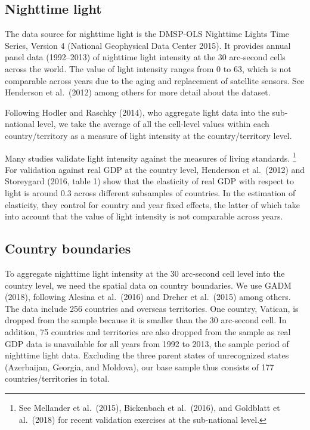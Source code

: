 \documentclass[12pt,a4paper]{article}%
\begin{document}
\subsection{Nighttime light}
The data source for nighttime light is the DMSP-OLS Nighttime Lights Time Series, Version 4 (National Geophysical Data Center 2015). 
It provides annual panel data (1992--2013) of nighttime light intensity at the 30 arc-second cells across the world. 
The value of light intensity ranges from 0 to 63, which is not comparable across years due to the aging and replacement of satellite sensors. 
See Henderson et al.\ (2012) among others for more detail about the dataset.

Following Hodler and Raschky (2014), who aggregate light data into the sub-national level, we take the average of all the cell-level values within each country/territory as a measure of light intensity at the country/territory level.

Many studies validate light intensity against the measures of living standards.%
\footnote{See Mellander et al.\ (2015), Bickenbach et al.\ (2016), and Goldblatt et al.\ (2018) for recent validation exercises at the sub-national level.} 
For validation against real GDP at the country level, Henderson et al.\ (2012) and Storeygard (2016, table 1) show that the elasticity of real GDP with respect to light is around 0.3 across different subsamples of countries. 
In the estimation of elasticity, they control for country and year fixed effects, the latter of which take into account that the value of light intensity is not comparable across years.

\subsection{Country boundaries}
To aggregate nighttime light intensity at the 30 arc-second cell level into the country level, we need the spatial data on country boundaries. 
We use GADM (2018), following Alesina et al.\ (2016) and Dreher et al.\ (2015) among others. 
The data include 256 countries and overseas territories. 
One country, Vatican, is dropped from the sample because it is smaller than the 30 arc-second cell. 
In addition, 75 countries and territories are also dropped from the sample as real GDP data is unavailable for all years from 1992 to 2013, the sample period of nighttime light data.
Excluding the three parent states of unrecognized states (Azerbaijan, Georgia, and Moldova), our base sample thus consists of 177 countries/territories in total.
\end{document}
